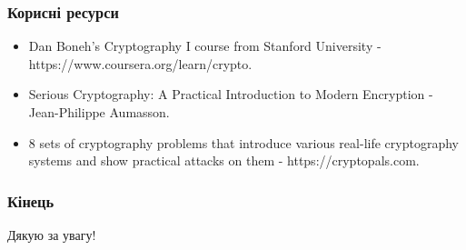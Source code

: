\documentclass{beamer}
\begin{document}
\begin{frame}
  \frametitle{Корисні ресурси}
  \begin{itemize}
  \item Dan Boneh's Cryptography I course from Stanford University -
    https://www.coursera.org/learn/crypto.
  \item Serious Cryptography: A Practical Introduction to Modern Encryption -
    Jean-Philippe Aumasson.
  \item 8 sets of cryptography problems that introduce various real-life
    cryptography systems and show practical attacks on them -
    https://cryptopals.com.
  \end{itemize}
\end{frame}

\begin{frame}
  \frametitle{Кінець}
  \begin{center}
    Дякую за увагу!
  \end{center}
\end{frame}
\end{document}
